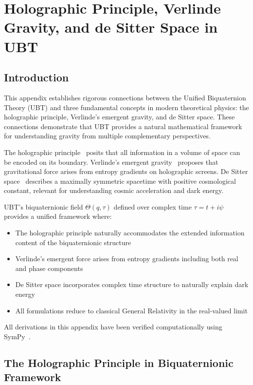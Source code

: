 
\section{Holographic Principle, Verlinde Gravity, and de Sitter Space in UBT}
\label{sec:holographic_verlinde_desitter}

\subsection{Introduction}

This appendix establishes rigorous connections between the Unified Biquaternion Theory (UBT) and three fundamental concepts in modern theoretical physics: the holographic principle, Verlinde's emergent gravity, and de Sitter space. These connections demonstrate that UBT provides a natural mathematical framework for understanding gravity from multiple complementary perspectives.

The holographic principle~\cite{tHooft1993,Susskind1995} posits that all information in a volume of space can be encoded on its boundary. Verlinde's emergent gravity~\cite{Verlinde2011} proposes that gravitational force arises from entropy gradients on holographic screens. De Sitter space~\cite{deSitter1917} describes a maximally symmetric spacetime with positive cosmological constant, relevant for understanding cosmic acceleration and dark energy.

UBT's biquaternionic field $\Theta(q,\tau)$ defined over complex time $\tau = t + i\psi$ provides a unified framework where:
\begin{itemize}
\item The holographic principle naturally accommodates the extended information content of the biquaternionic structure
\item Verlinde's emergent force arises from entropy gradients including both real and phase components
\item De Sitter space incorporates complex time structure to naturally explain dark energy
\item All formulations reduce to classical General Relativity in the real-valued limit
\end{itemize}

All derivations in this appendix have been verified computationally using SymPy~\cite{SymPy2024}.

\subsection{The Holographic Principle in Biquaternionic Framework}


